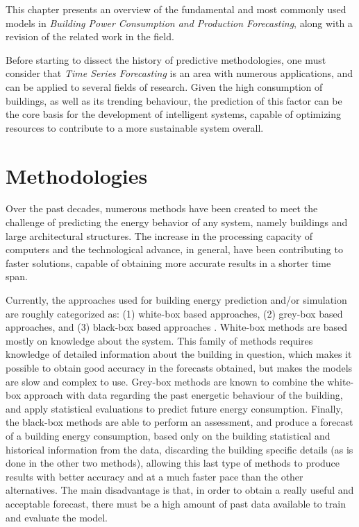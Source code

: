\cleardoublepage
\label{chap:background}

This chapter presents an overview of the fundamental and most commonly used models in \textit{Building Power Consumption and Production Forecasting}, along with a revision of the related work in the field.

Before starting to dissect the history of predictive methodologies, one must consider that \textit{Time Series Forecasting} is an area with numerous applications, and can be applied to several fields of research. Given the high consumption of buildings, as well as its trending behaviour, the prediction of this factor can be the core basis for the development of intelligent systems, capable of optimizing resources to contribute to a more sustainable system overall.


\section{Methodologies\label{a}}

Over the past decades, numerous methods have been created to meet the challenge of predicting the energy behavior of any system, namely buildings and large architectural structures. The increase in the processing capacity of computers and the technological advance, in general, have been contributing to faster solutions, capable of obtaining more accurate results in a shorter time span.

Currently, the approaches used for building energy prediction and/or simulation are roughly categorized as: (1) white-box based approaches, (2) grey-box based approaches, and (3) black-box based approaches \cite{review2017}. White-box methods are based mostly on knowledge about the system. This family of methods requires knowledge of detailed information about the building in question, which makes it possible to obtain good accuracy in the forecasts obtained, but makes the models are slow and complex to use. Grey-box methods are known to combine the white-box approach with data regarding the past energetic behaviour of the building, and apply statistical evaluations to predict future energy consumption. Finally, the black-box methods are able to perform an assessment, and produce a forecast of a building energy consumption, based only on the building statistical and historical information from the data, discarding the building specific details (as is done in the other two methods), allowing this last type of methods to produce results with better accuracy and at a much faster pace than the other alternatives. The main disadvantage is that, in order to obtain a really useful and acceptable forecast, there must be a high amount of past data available to train and evaluate the model.

